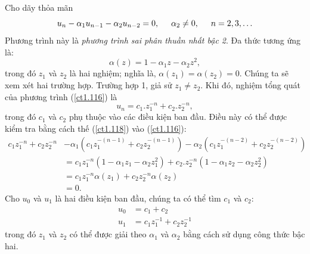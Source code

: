 \documentclass[12pt, a4paper,oneside]{book}
\theoremstyle{definition}
\begin{document}
Cho dãy thỏa mãn
\begin{equation}
u_{n}-\alpha_{1}u_{n-1}-\alpha_{2}u_{n-2}=0, \hspace{0.5cm} \alpha_{2}\neq 0, \hspace{0.5cm} n=2, 3, \dots \label{ct1.116}
\end{equation}
Phương trình này là \textit{phương trình sai phân thuần nhất bậc 2}. Đa thức tương ứng là:
$$\alpha(z)=1-\alpha_{1}z-\alpha_{2}z^{2},$$ trong đó $z_{1}$ và $z_{2}$ là hai nghiệm; nghĩa là, $\alpha(z_{1})=\alpha(z_{2})=0$. Chúng ta sẽ xem xét hai trường hợp. Trường hợp 1, giả sử $z_{1}\neq z_{2}$. Khi đó, nghiệm tổng quát của phương trình (\ref{ct1.116}) là
\begin{equation}
u_{n}=c_{1}. z_{1}^{-n} + c_{2}. z_{2}^{-n}, \label{ct1.118}
\end{equation}
trong đó $c_{1}$ và $c_{2}$ phụ thuộc vào các điều kiện ban đầu. Điều này có thể được kiểm tra bằng cách thế (\ref{ct1.118}) vào (\ref{ct1.116}):
\begin{align*}
c_{1}z_{1}^{-n}  + c_{2}z_{2}^{-n} &- \alpha_{1} (c_{1}z_{1}^{-(n-1)}+ 	c_{2} z_{2}^{-(n-1)}) - \alpha_{2} (	c_{1} z_{1}^{-(n-2)}+ 	c_{2} z_{2}^{-(n-2)})\\
&= c_{1}z_{1}^{-n}(1-\alpha_{1}z_{1}-\alpha_{2}z_{1}^{2}) +  c_{2}. z_{2}^{-n}(1-\alpha_{1}z_{2}-\alpha_{2}z_{2}^{2})\\
&=c_{1}z_{1}^{-n}\alpha(z_{1}) + c_{2}z_{2}^{-n}\alpha(z_{2})\\
&=0.
\end{align*}
Cho $u_{0}$ và $u_{1}$ là hai điều kiện ban đầu, chúng ta có thể tìm $c_{1}$ và $c_{2}$:
\begin{align*}
u_{0}&= c_{1}+ c_{2}\\
u_{1}&=c_{1}z_{1}^{-1} + c_{2}z_{2}^{-1}
\end{align*}
trong đó $z_{1}$ và $z_{2}$ có thể được giải theo $\alpha_{1}$ và $\alpha_{2}$ bằng cách sử dụng công thức bậc hai.
\end{document}

